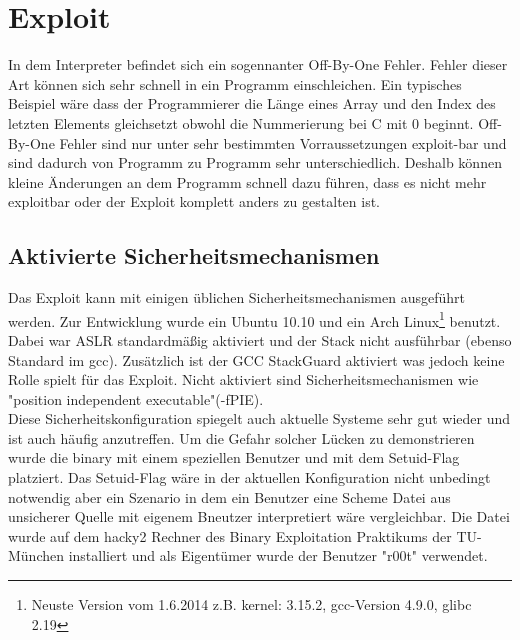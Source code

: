 \section{Exploit}
In dem Interpreter befindet sich ein sogennanter Off-By-One Fehler. Fehler dieser Art können sich sehr schnell in ein Programm einschleichen. Ein typisches Beispiel wäre dass der Programmierer die Länge eines Array und den Index des letzten Elements gleichsetzt obwohl die Nummerierung bei C mit 0 beginnt. Off-By-One Fehler sind nur unter sehr bestimmten Vorraussetzungen exploit-bar und sind dadurch von Programm zu Programm sehr unterschiedlich. Deshalb können kleine Änderungen an dem Programm schnell dazu führen, dass es nicht mehr exploitbar oder der Exploit komplett anders zu gestalten ist.
\subsection{Aktivierte Sicherheitsmechanismen}
Das Exploit kann mit einigen üblichen Sicherheitsmechanismen ausgeführt werden. Zur Entwicklung wurde ein Ubuntu 10.10 und ein Arch Linux\footnote{Neuste Version vom 1.6.2014 z.B. kernel: 3.15.2, gcc-Version 4.9.0, glibc 2.19} benutzt. Dabei war ASLR standardmäßig aktiviert und der Stack nicht ausführbar (ebenso Standard im gcc). Zusätzlich ist der GCC StackGuard aktiviert was jedoch keine Rolle spielt für das Exploit. Nicht aktiviert sind Sicherheitsmechanismen wie "position independent executable"(-fPIE).
\\
Diese Sicherheitskonfiguration spiegelt auch aktuelle Systeme sehr gut wieder und ist auch häufig anzutreffen. Um die Gefahr solcher Lücken zu demonstrieren wurde die binary mit einem speziellen Benutzer und mit dem Setuid-Flag platziert. Das Setuid-Flag wäre in der aktuellen Konfiguration nicht unbedingt notwendig aber ein Szenario in dem ein Benutzer eine Scheme Datei aus unsicherer Quelle mit eigenem Bneutzer interpretiert wäre vergleichbar. Die Datei wurde auf dem hacky2 Rechner des Binary Exploitation Praktikums der TU-München installiert und als Eigentümer wurde der Benutzer "r00t" verwendet.

